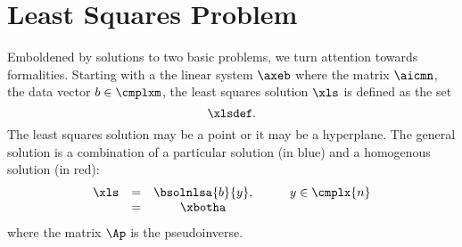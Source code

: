 \section{\label{sec:lsp}Least Squares Problem}  %
Emboldened by solutions to two basic problems, we turn attention towards formalities. Starting with a the linear system $\axeb$ where the matrix $\aicmn$, the data vector $b\in\cmplxm$, the least squares solution $\xls$ is defined as the set
  \begin{equation}   %
    \xlsdef .
    \label{eq:xlsdef}
  \end{equation}
The least squares solution may be a point or it may be a hyperplane. The general solution is a combination of a particular solution (in blue) and a homogenous solution (in red):
  \begin{equation*}   %
   \begin{array}{cccccl}
     \xls 
       & = & \bsolnlsa{b}{y}, & \qquad y \in \cmplx{n} \\
       & = & \xbotha
   \end{array}
  \end{equation*}
where the matrix $\Ap$ is the pseudoinverse.


\endinput